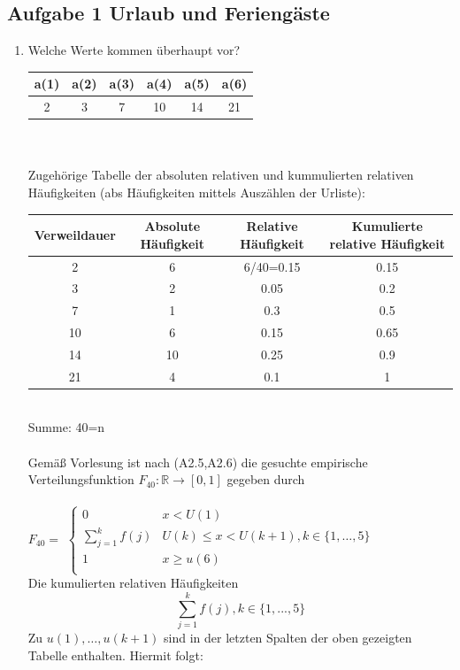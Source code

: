 \documentclass[10pt,a4paper]{article}
\begin{document}
\subsection{Aufgabe 1 Urlaub und Feriengäste}
\begin{enumerate}[label=(\alph*)]
	\item Welche Werte kommen überhaupt vor?\\
	\begin{tabular}{|c|c|c|c|c|c|}
		\hline a(1) & a(2) & a(3) & a(4) & a(5) & a(6) \\ 
		\hline 2 & 3 & 7 & 10 & 14 & 21 \\ 
		\hline 
	\end{tabular} \\~\\
	Zugehörige Tabelle der absoluten relativen und kummulierten relativen Häufigkeiten (abs Häufigkeiten mittels Auszählen der Urliste):\\
	\begin{tabular}{|c|c|c|c|}
		\hline Verweildauer & Absolute Häufigkeit & Relative Häufigkeit & Kumulierte relative Häufigkeit \\ 
		\hline 2 & 6 & 6/40=0.15 & 0.15 \\ 
		\hline 3 & 2 & 0.05 & 0.2 \\ 
		\hline 7 & 1 & 0.3 & 0.5 \\ 
		\hline 10 & 6 & 0.15 & 0.65 \\ 
		\hline 14 & 10 & 0.25 & 0.9 \\ 
		\hline 21 & 4 & 0.1 & 1 \\ 
		\hline 
	\end{tabular}\\
	Summe: 40=n\\~\\
	Gemäß Vorlesung ist nach (A2.5,A2.6)  die gesuchte empirische Verteilungsfunktion $F_{40}:\mathbb{R}\rightarrow[0,1]$ gegeben durch\\~\\
		$F_{40}=$
	$\begin{cases}
		0  & x < U(1)\\
		\sum_{j=1}^{k}f(j)  &  U(k) \leq x < U(k+1), k \in \{1,\dots, 5\}\\
		1 & x \geq u(6)\\
	\end{cases}$\\
	Die kumulierten relativen Häufigkeiten $$\sum_{j=1}^{k}f(j), k\in \{1,...,5\}$$ 
	Zu $ u(1),\dots,u(k+1)$ sind in der letzten Spalten der oben gezeigten Tabelle enthalten. Hiermit folgt: \\~\

\end{enumerate}
\end{document}
